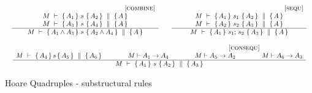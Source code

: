 \begin{figure}[htb]
$
\begin{array}{c}
\begin{array}{lcl}
\inferruleSD{[\sc{combine}]}
	{  \begin{array}{l}
	\hprovesN{M}  {A_1} {\ s\ } {A_2}  {A} \\ %
	\hprovesN{M}  {A_3} {\ s\ } {A_4} {A}
	\end{array}
	}
	{ \hprovesN{M}  {A_1 \wedge A_3 }{\ s\ } {A_2 \wedge A_4} {A} }
& &
\inferruleSD{[\sc{sequ}]}
	{  \begin{array}{l} 
	\hprovesN{M}  {A_1} {\ s_1\ } {A_2}  {A}  \\ %
	\hprovesN{M}  {A_2} {\ s_2\ } {A_3} {A}
	\end{array}
	}
	{   \hprovesN{M}  {A_1   }{\ s_1; \, s_2\ } {  A_3} {A} }
\end{array}
\\ \\
\inferruleSD{ \hspace{3cm} [\sc{consequ}]}
	{
	 { \hprovesN  {M}  {A_4} {\, s\, } { A_5} {A_6}  }
	 \hspace{1.4cm} 
	 M \vdash A_1 \rightarrow A_4 
	 \hspace{1.4cm} 
	{ M \vdash A_5   \rightarrow  A_2  }
	 \hspace{1.4cm}   
	{  M \vdash A_6 \rightarrow A_3 }
	}
	{   \hprovesN{M}  {A_1 }{\ s\ } {A_2} {A_3} }
  \end{array}
 $
 \vspace{-.5cm}
\caption{Hoare Quadruples -    substructural rules }
\label{f:substructural:app}
\end{figure}

%
%
 
